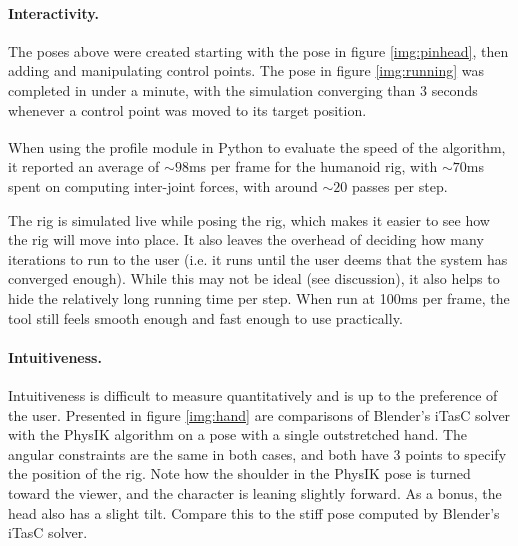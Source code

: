 \documentclass[10pt,twocolumn,letterpaper]{article}
\begin{document}
\paragraph{Interactivity.} The poses above were created starting with the pose in figure \ref{img:pinhead}, then adding and manipulating control points. The pose in figure \ref{img:running} was completed in under a minute, with the simulation converging than 3 seconds whenever a control point was moved to its target position.

When using the profile module in Python\textsuperscript{\cite{Pr}} to evaluate the speed of the algorithm, it reported an average of $\sim 98$ms per frame for the humanoid rig, with $\sim 70$ms spent on computing inter-joint forces, with around $\sim 20$ passes per step. 

The rig is simulated live while posing the rig, which makes it easier to see how the rig will move into place. It also leaves the overhead of deciding how many iterations to run to the user (i.e. it runs until the user deems that the system has converged enough). While this may not be ideal (see discussion), it also helps to hide the relatively long running time per step. When run at 100ms per frame, the tool still feels smooth enough and fast enough to use practically.

\paragraph{Intuitiveness.} Intuitiveness is difficult to measure quantitatively and is up to the preference of the user. Presented in figure \ref{img:hand} are comparisons of Blender's iTasC solver with the PhysIK algorithm on a pose with a single outstretched hand. The angular constraints are the same in both cases, and both have 3 points to specify the position of the rig. Note how the shoulder in the PhysIK pose is turned toward the viewer, and the character is leaning slightly forward. As a bonus, the head also has a slight tilt. Compare this to the stiff pose computed by Blender's iTasC solver. 
\end{document}
